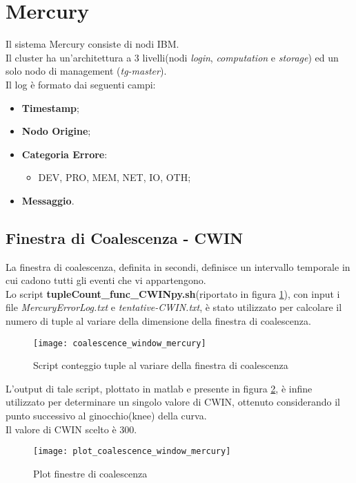 \clearpage

\section{Mercury}
Il sistema Mercury consiste di nodi IBM.\\
Il cluster ha un'architettura a 3 livelli(nodi \textit{login}, \textit{computation}
e \textit{storage}) ed un solo nodo di management
(\textit{tg-master}).\\
Il log è formato dai seguenti campi:
\begin{itemize}
  \item \textbf{Timestamp};
  \item \textbf{Nodo Origine};
  \item \textbf{Categoria Errore}:
  \begin{itemize}
    \item DEV, PRO, MEM, NET, IO, OTH;
  \end{itemize}
  \item \textbf{Messaggio}.
\end{itemize}

\subsection{Finestra di Coalescenza - CWIN}
La finestra di coalescenza, definita in secondi, definisce un intervallo temporale
in cui cadono tutti gli eventi che vi appartengono.\\
Lo script \textbf{tupleCount\_func\_CWINpy.sh}(riportato in figura \ref{ffda_coalescence_window_mercury}), con input i file \textit{MercuryErrorLog.txt}
e \textit{tentative-CWIN.txt}, è stato utilizzato per calcolare il numero di tuple al
variare della dimensione della finestra di coalescenza.\\

\begin{figure}[!htbp]
  \texttt{[image: coalescence\_window\_mercury]}
  \caption{Script conteggio tuple al variare della finestra di coalescenza}
  \label{ffda_coalescence_window_mercury}
\end{figure}

\clearpage

L'output di tale script, plottato in matlab e presente in figura \ref{ffda_plot_coalescence_window_mercury},
è infine utilizzato per determinare un singolo valore di CWIN, ottenuto
considerando il punto successivo al ginocchio(knee) della curva.\\
Il valore di CWIN scelto è 300.\\
\begin{figure}[!htbp]
  \texttt{[image: plot\_coalescence\_window\_mercury]}
  \caption{Plot finestre di coalescenza}
  \label{ffda_plot_coalescence_window_mercury}
\end{figure}

